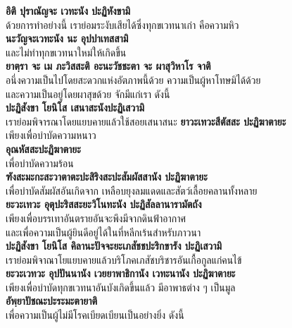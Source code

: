 \documentclass[12pt]{article}
\begin{document}
\textbf{อิติ ปุราณัญจะ เวทะนัง ปะฏิหังขามิ\\}
\indent ด้วยการทำอย่างนี้ เราย่อมระงับเสียได้ซึ่งทุกขเวทนาเก่า คือความหิว\\
\textbf{นะวัญจะเวทะนัง นะ อุปปาเทสสามิ\\}
\indent และไม่ทำทุกขเวทนาใหม่ให้เกิดขึ้น\\
\textbf{ยาตฺรา จะ เม ภะวิสสะติ อะนะวัชชะตา จะ ผาสุวิหาโร จาติ\\}
\indent อนึ่งความเป็นไปโดยสะดวกแห่งอัตภาพนี้ด้วย ความเป็นผู้หาโทษมิได้ด้วย\\ 
\indent และความเป็นอยู่โดยผาสุขด้วย จักมีแก่เรา ดังนี้\\
\textbf{ปะฏิสังขา โยนิโส เสนาสะนังปะฏิเสวามิ\\}
\indent เราย่อมพิจารณาโดยแยบคายแล้วใช้สอยเสนาสนะ
\textbf{ยาวะเทวะสีตัสสะ ปะฏิฆาตายะ}\\
\indent เพียงเพื่อบำบัดความหนาว\\
\textbf{อุณหัสสะปะฏิฆาตายะ}\\
\indent เพื่อบำบัดความร้อน\\
\textbf{ฑังสะมะกะสะวาตาตะปะสิริงสะปะสัมผัสสานัง ปะฏิฆาตายะ}\\
\indent เพื่อบำบัดสัมผัสอันเกิดจาก เหลือบยุงลมแดดและสัตว์เลื้อยคลานทั้งหลาย\\
\textbf{ยะวะเทวะ อุตุปะริสสะยะวิโนทะนัง ปะฏิสัลลานารามัตถัง}\\
\indent เพียงเพื่อบรรเทาอันตรายอันจะพึงมีจากดินฟ้าอากาศ\\ 
\indent และเพื่อความเป็นผู้ยินดีอยู่ได้ในที่หลีกเร้นสำหรับภาวนา\\
\textbf{ปะฏิสังขา โยนิโส คิลานะปัจจะยะเภสัชชปะริกขารัง ปะฏิเสวามิ}\\
\indent เราย่อมพิจาณาโยแยบคายแล้วบริโภคเภสัชบริชารอันเกื้อกูลแก่คนไข้\\
\textbf{ยะวะเวทวะ อุปปันนานัง เวยยาพาธิกานัง เวทะนานัง ปะฏิฆาตายะ}\\
\indent เพียงเพื่อบำบัดทุกขเวทนาอันบังเกิดขึ้นแล้ว มีอาพาธต่าง ๆ เป็นมูล\\
\textbf{อัพฺยาปัชณะปะระมะตายาติ}\\
\indent เพื่อความเป็นผู้ไม่มีโรคเบียดเบียนเป็นอย่างยิ่ง ดังนี้\\

\pagebreak
\end{document}
